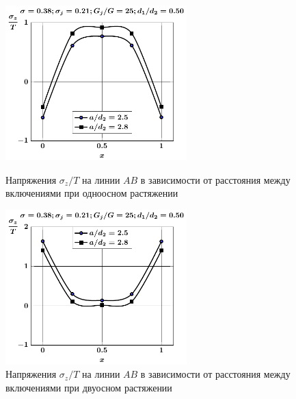 \begin{figure}[h!]
\centering\footnotesize
\parbox[b]{7.5cm}{\centering\includegraphics[width=7cm]{periodic-oblate-inc27-a-d50-g25-t1-sig_z.pdf}
\caption{Напряжения $\sigma_z/T$ на линии $AB$ в зависимости от расстояния между включениями при одноосном растяжении
\label{f:11:47}}}\hfil\hfil
\parbox[b]{7.5cm}{\centering\includegraphics[width=7cm]{periodic-oblate-inc27-a-d50-g25-t2-sig_z.pdf}
\caption{Напряжения $\sigma_z/T$ на линии $AB$ в зависимости от расстояния между включениями при двуосном растяжении
\label{f:11:48}}}
\end{figure}

